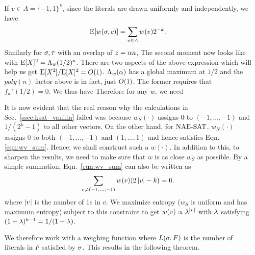 \documentclass[letterpaper, 10pt, twocolumn, reqno]{amsart}
\begin{document}
If $v \in A = \{-1,1\}^k$, since the literals are drawn uniformly and independently, we have
$$
\textrm{E}[w(\sigma,c)] = \sum_{v \in A} w(v) 2^{-k}.
$$
Similarly for $\sigma, \tau$ with an overlap of $z =\alpha n$,
The second moment now looks like
with $\textrm{E}[X]^2 = \Lambda_w(1/2)^n$. There are two aspects of the above expression which will help us get $\textrm{E}[X^2]/\textrm{E}[X]^2 = O(1)$. $\Lambda_w(\alpha)$ has a global maximum at $1/2$ and the $poly(n)$ factor above is in fact, just $O(1)$. The former requires that $f_w'(1/2) =0$. We thus have
Therefore for any $w$, we need

It is now evident that the real reason why the calculations in Sec.~\ref{ssec:ksat_vanilla} failed was because $w_S(\cdot)$ assigns 0 to $(-1,\ldots,-1)$
and $1/(2^k-1)$ to all other vectors. On the other hand, for $\textrm{NAE-SAT}$, $w_N(\cdot)$ assigns 0 to both $(-1,\ldots,-1)$ and $(1,\ldots,1)$ and hence satisfies Eqn.~
\eqref{eqn:wv_sum}. Hence, we shall construct such a $w(\cdot)$. In addition to this, to sharpen the results, we need to make sure that $w$ is as close $w_S
$ as possible. By a simple summation, Eqn.~\eqref{eqn:wv_sum} can also be written as
$$
\sum_{v \neq (-1,\ldots,-1)} w(v) (2\left| v \right| - k) = 0.
$$
where $\left| v \right|$ is the number of 1s in $v$. We maximize entropy ($w_S$ is uniform and has maximum entropy) subject to this constraint to get $w(v) \propto \lambda^{\left| v \right|}$ with $\lambda$ satisfying $(1+\lambda)^{k-1} = 1/(1-\lambda)$.

We therefore work with a weighing function
where $L(\sigma,F)$ is the number of literals in $F$ satisfied by $\sigma$. This results in the following theorem.
\end{document}
